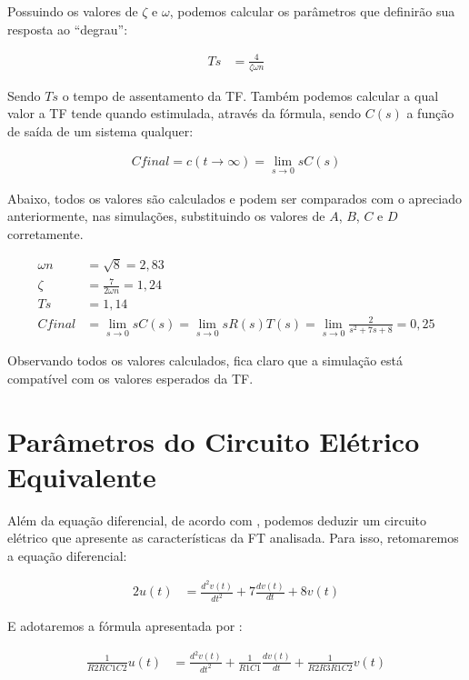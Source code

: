 \documentclass[
	article,			%
	11pt,				%
	oneside,			%
	a4paper,			%
	english,			%
	brazil,				%
	sumario=tradicional
	]{abntex2}
\begin{document}
Possuindo os valores de ${\zeta}$ e ${\omega}$, podemos calcular os parâmetros que definirão sua resposta ao ``degrau'':

\begin{align*}
  Ts &= \frac{4}{\zeta\omega n}
\end{align*}

Sendo ${Ts}$ o tempo de assentamento da TF. Também podemos calcular a qual valor a TF tende quando estimulada, através da fórmula, sendo ${C(s)}$ a função de saída de um sistema qualquer:

\begin{align*}
  Cfinal = c(t\to\infty) = \lim_{s\to 0} sC(s)
\end{align*}

Abaixo, todos os valores são calculados e podem ser comparados com o apreciado anteriormente, nas simulações, substituindo os valores de ${A}$, ${B}$, ${C}$ e ${D}$ corretamente.

\begin{align*}
  \omega n &= \sqrt{8} = 2,83 \\
  \zeta &= \frac{7}{2\omega n} = 1,24 \\
  Ts &= 1,14 \\
  Cfinal &= \lim_{s\to 0} sC(s) = \lim_{s\to 0} sR(s)T(s) = \lim_{s\to 0} \frac{2}{s^2 + 7s + 8} = 0,25
\end{align*}

Observando todos os valores calculados, fica claro que a simulação está compatível com os valores esperados da TF.

\section{Parâmetros do Circuito Elétrico Equivalente}

Além da equação diferencial, de acordo com \cite{controleessencial}, podemos deduzir um circuito elétrico que
apresente as características da FT analisada. Para isso, retomaremos a equação diferencial:

\begin{align*}
  2u(t) &= \frac{d^2 v(t)}{dt^2} + 7\frac{d v(t)}{dt} + 8v(t)
\end{align*}

E adotaremos a fórmula apresentada por \cite{controleessencial}:

\begin{align*}
  \frac{1}{R2RC1C2}u(t) &= \frac{d^2 v(t)}{dt^2} + \frac{1}{R1C1}\frac{d v(t)}{dt} + \frac{1}{R2R3R1C2}v(t)
\end{align*}
\end{document}

